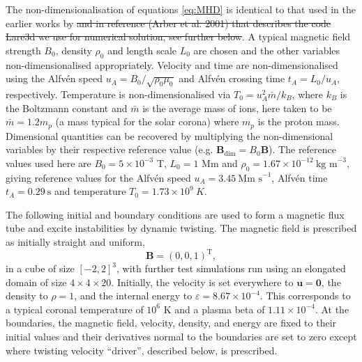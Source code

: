 \documentclass[fleqn,usenatbib]{mnras}
\newcommand{\rev}[1]{{\color{red} {#1}}}
\newcommand{\revcite}[1]{{\color{red} \underline{#1}}}
\renewcommand{\vec}[1]{{\bm #1}}
\begin{document}
The non-dimensionalisation of equations \eqref{eq:MHD} is identical to that
used in the earlier
works by \revcite{\citet{quinnEffectAnisotropicViscosity2020,quinnKelvinHelmholtzInstabilityCollapse2021}}
\rev{\sout{and in reference (Arber et al. 2001) that describes the code Lare3d we use
for numerical solution, see further below}}.
A typical magnetic field strength $B_0$, density $\rho_0$ and length scale
$L_0$ are chosen and the other variables non-dimensionalised appropriately.
Velocity and time are non-dimensionalised using the Alfv\'en speed $u_A = B_0
/ \sqrt{\rho_0 \mu_0}$ and Alfv\'en crossing time $t_A = L_0/u_A$,
respectively. Temperature is non-dimensionalised via $T_0 = u_A^2 \bar{m}
/ k_B$, where $k_B$ is the Boltzmann constant and $\bar{m}$ is the average mass
of ions, here taken to be $\bar{m} = 1.2m_p$ (a mass typical for the solar
corona) where $m_p$ is the proton mass. Dimensional quantities can be recovered
by multiplying the non-dimensional variables by their respective reference
value (e.g. $\vec{B}_{\dim} = B_0 \vec{B}$). The reference values used here are
$B_0 = 5 \times 10^{-3}$ T, $L_0 = 1$ Mm and $\rho_0 = 1.67 \times 10^{-12}
\ \text{kg m}^{-3}$, giving reference values for the Alfv\'en speed $u_A
= 3.45\ \text{Mm s}^{-1}$, Alfv\'en time $t_A =
0.29\ \text{s}$ and temperature $T_0 = 1.73 \times 10^{9}\ K$.      

The following initial and boundary conditions are used to form a magnetic flux
tube and excite instabilities by dynamic twisting. The magnetic field is
prescribed as initially straight and uniform,
\begin{equation}
\vec{B} = (0, 0, 1)^{\text{T}},
\end{equation}
in a cube of size $[-2,2]^3$, with further test simulations run using an
elongated domain of size $4\times4\times20$. Initially, the velocity is set
everywhere to $\vec{u} = \vec{0}$, the density to $\rho = 1$, and the internal
energy to $\varepsilon = 8.67\times 10^{-4}$. This corresponds to a typical
coronal temperature of $10^6$ K and a plasma beta of $1.11 \times 10^{-4}$. At
the boundaries, the magnetic field, velocity, density, and energy are fixed to
their initial values and their derivatives normal to the boundaries are set to
zero  except where twisting velocity ``driver'', described below, is
prescribed.
\end{document}

